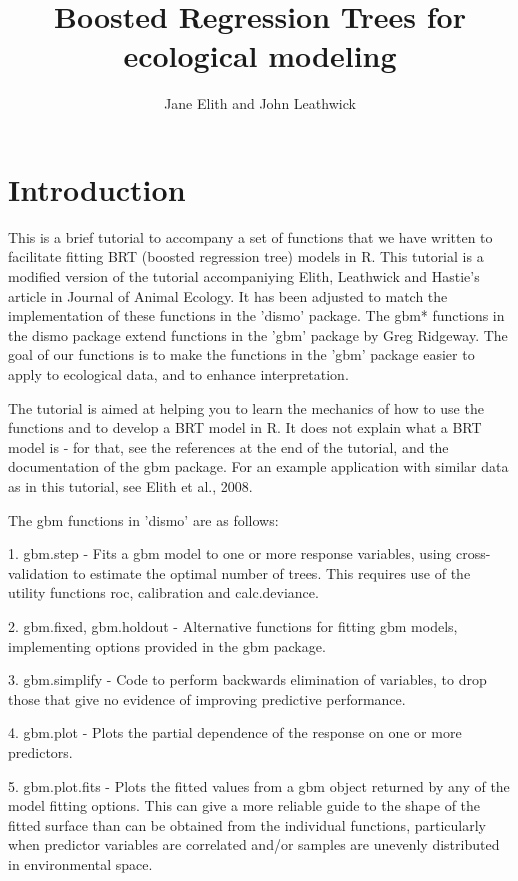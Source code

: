 \documentclass{article}
\begin{document}
\title{Boosted Regression Trees for ecological modeling}

\author{Jane Elith and John Leathwick}

\maketitle

\section{Introduction}

This is a brief tutorial to accompany a set of functions that we have written to facilitate fitting BRT (boosted regression tree) models in R.  This tutorial is a modified version of the tutorial accompaniying Elith, Leathwick and Hastie's article in Journal of Animal Ecology. It has been adjusted to match the implementation of these functions in the 'dismo' package. The gbm* functions in the dismo package extend functions in the 'gbm' package by Greg Ridgeway. The goal of our functions is to make the functions in the 'gbm' package easier to apply to ecological data, and to enhance interpretation. 

The tutorial is aimed at helping you to learn the mechanics of how to use the functions and to develop a BRT model in R. It does not explain what a BRT model is - for that, see the references at the end of the tutorial, and the documentation of the gbm package. For an example application with similar data as in this tutorial, see Elith et al., 2008. 

The gbm functions in 'dismo' are as follows:

1. gbm.step - Fits a gbm model to one or more response variables, using cross-validation to estimate the optimal number of trees. This requires use of the utility functions roc, calibration and calc.deviance. 

2. gbm.fixed, gbm.holdout - Alternative functions for fitting gbm models, implementing options provided in the gbm package.

3. gbm.simplify - Code to perform backwards elimination of variables, to drop those that give no evidence of improving predictive performance.

4. gbm.plot - Plots the partial dependence of the response on one or more predictors.

5. gbm.plot.fits - Plots the fitted values from a gbm object returned by any of the model fitting options. This can give a more reliable guide to the shape of the fitted surface than can be obtained from the individual functions, particularly when predictor variables are correlated and/or samples are unevenly distributed in environmental space. 
\end{document}
